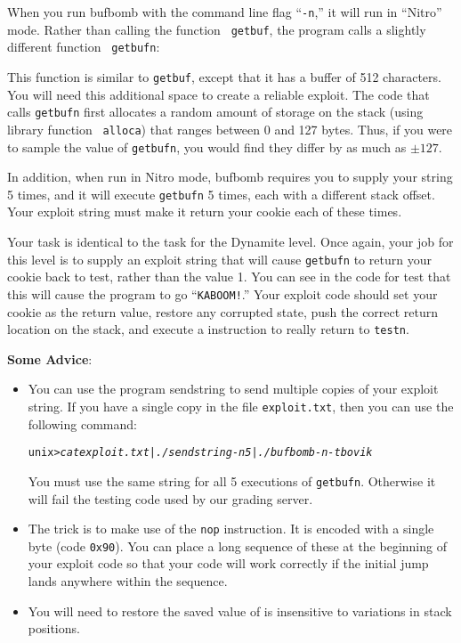 \documentclass[11pt]{article}
\newenvironment{ccode}%
{\small}%
{}
\newenvironment{tty}%
{\small\begin{alltt}}%
{\end{alltt}}
\begin{document}
When you run {\sc bufbomb} with the command line flag ``{\tt -n},'' it
will run in ``Nitro'' mode.  Rather than calling the function {\tt
getbuf}, the program calls a slightly different function {\tt
getbufn}:

\begin{ccode}

\end{ccode}

This function is similar to {\tt getbuf}, except that it has a buffer
of 512 characters.  You will need this additional space to create a
reliable exploit.  The code that calls {\tt getbufn} first allocates a
random amount of storage on the stack (using library function {\tt
alloca}) that ranges between 0 and 127 bytes.  Thus, if you were to
sample the value of \verb@%ebp@ during two successive executions of
{\tt getbufn}, you would find they differ by as much as $\pm 127$.

In addition, when run in Nitro mode, {\sc bufbomb} requires you to
supply your string 5 times, and it will execute {\tt getbufn} 5 times,
each with a different stack offset.  Your exploit string must make it
return your cookie each of these times.

Your task is identical to the task for the Dynamite level. Once again,
your job for this level is to supply an exploit string that will cause
\texttt{getbufn} to return your cookie back to test, rather than the value 1.
You can see in the code for test that this will cause the program to go
``{\tt KABOOM!}.'' Your exploit code should set your cookie as the return
value, restore any corrupted state, push the correct return location on
the stack, and execute a \verb@ret@ instruction to really return to
{\tt testn}.

{\bf Some Advice}:
\begin{itemize}
\item You can use the program {\sc sendstring} to send multiple copies
of your exploit string. 
 If you have a single copy in the file {\tt exploit.txt}, then you can 
use the following command:

\begin{tty}
unix>{\em cat exploit.txt | ./sendstring -n 5 | ./bufbomb -n -t bovik}
\end{tty}

You must use the same string for all 5 executions of {\tt getbufn}.
Otherwise it will fail the testing code used by our grading server.

\item
The trick is to make use of the {\tt nop} instruction.  It is encoded with
a single byte (code {\tt 0x90}).  You can place a long sequence of
these at the beginning of your exploit code so that your code will work
correctly if the initial jump lands anywhere within the sequence.

\item
You will need to restore the saved value of \verb@%ebp@ in a way that
is insensitive to variations in stack positions.

\end{itemize}
\end{document}
